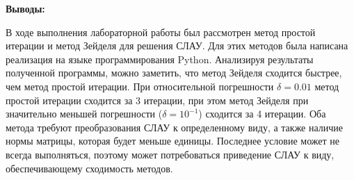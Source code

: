 \documentclass [12pt]{article}
\begin{document}
\textbf{Выводы:}

В ходе выполнения лабораторной работы был рассмотрен метод простой итерации и метод Зейделя для решения СЛАУ. Для этих методов была написана реализация на языке программирования Python. Анализируя результаты полученной программы, можно заметить, что метод Зейделя сходится быстрее, чем метод простой итерации. При относительной погрешности $\delta = 0.01$ метод простой итерации сходится за 3 итерации, при этом метод Зейделя при значительно меньшей погрешности ($\delta = 10^{-1}$) сходится за 4 итерации. Оба метода требуют преобразования СЛАУ к определенному виду, а также наличие нормы матрицы, которая будет меньше единицы. Последнее условие может не всегда выполняться, поэтому может потребоваться приведение СЛАУ к виду, обеспечивающему сходимость методов. 
\end{document}
